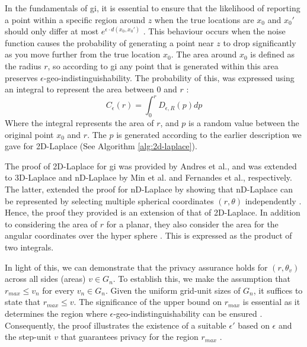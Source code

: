 In the fundamentals of \gls{gi}, it is essential to ensure that the likelihood of reporting a point within a specific region around $z$ when the true locations are $x_0$ and $x_0'$ should only differ at most $e^{\epsilon \cdot d(x_0, x_0')}$ \citep{DBLP:journals/corr/abs-1212-1984}. This behaviour occurs when the noise function causes the probability of generating a point near $z$ to drop significantly as you move further from the true location $x_0$.
The area around $x_0$ is defined as the radius $r$, so according to \gls{gi} any point that is generated within this area preserves $\epsilon$-geo-indistinguishability. The probability of this, was expressed using an integral to represent the area between 0 and $r$ \citep{DBLP:journals/corr/abs-1212-1984}:
\begin{equation}
    C_\epsilon(r) = \int^{r}_0 D_{\epsilon, R}(p)dp
\end{equation}
Where the integral represents the area of $r$, and $p$ is a random value between the original point $x_0$ and $r$. The $p$ is generated according to the earlier description we gave for 2D-Laplace (See Algorithm \ref{alg:2d-laplace}).

The proof of 2D-Laplace for \gls{gi} was provided by Andres et al., and was extended to 3D-Laplace and nD-Laplace by Min et al. and Fernandes et al., respectively. 
The latter, extended the proof for nD-Laplace by showing that nD-Laplace can be represented by selecting multiple spherical coordinates $(r, \theta)$ independently \citep{fernandes_generalised_2019}. Hence, the proof they provided is an extension of that of 2D-Laplace. In addition to considering the area of $r$ for a planar, they also consider the area for the angular coordinates over the hyper sphere \citep{fernandes_generalised_2019}. This is expressed as the product of two integrals.\newline

In light of this, we can demonstrate that the privacy assurance holds for $(r, \theta_v)$ across all sides (areas) $v \in G_n$. 
To establish this, we make the assumption that $r_{max} \leq v_n$ for every $v_n \in G_n$. 
Given the uniform grid-unit sizes of $G_n$, it suffices to state that $r_{max} \leq v$. 
The significance of the upper bound on $r_{max}$ is essential as it determines the region where $\epsilon$-geo-indistinguishability can be ensured \citep{DBLP:journals/corr/abs-1212-1984}. Consequently, the proof illustrates the existence of a suitable $\epsilon'$ based on $\epsilon$ and the step-unit $v$ that guarantees privacy for the region $r_{max}$ \citep{DBLP:journals/corr/abs-1212-1984}.

